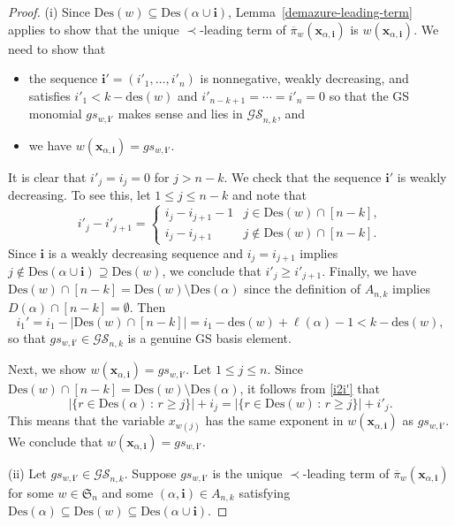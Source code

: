 \documentclass[10pt]{amsart}
\theoremstyle{definition}
\newcommand{\Des}{{\mathrm {Des}}}
\newcommand{\des}{{\mathrm {des}}}
\newcommand{\symm}{{\mathfrak{S}}}
\newcommand{\GS}{{\mathcal{GS}}}
\newcommand{\xx}{{\mathbf {x}}}
\newcommand{\ii}{{\mathbf{i}}}
\newcommand{\pib}{\overline{\pi}}
\begin{document}
\begin{proof}
(i)  Since $\Des(w) \subseteq \Des(\alpha \cup \ii)$,
Lemma~\ref{demazure-leading-term} applies to show that the unique $\prec$-leading term of 
$\pib_w(\xx_{\alpha,\ii})$ is $w(\xx_{\alpha,\ii})$.  
We need to show that
\begin{itemize}
\item
the sequence $\ii' = (i'_1, \dots, i'_n)$ is nonnegative, 
weakly decreasing, and satisfies $i'_1 < k - \des(w)$ and $i'_{n-k+1} = \cdots = i'_n = 0$
so that the GS monomial $gs_{w,\ii'}$ makes sense and lies in $\GS_{n,k}$, and
\item we have $w(\xx_{\alpha,\ii}) = gs_{w,\ii'}$.
\end{itemize}


It is clear that $i'_j = i_j = 0$ for $j > n-k$.
We check that the sequence $\ii'$ is weakly decreasing.  To see this,  let $1 \leq j \leq n-k$ and
note that 
\begin{equation}
i'_j - i'_{j+1} = \begin{cases}
i_j - i_{j+1} - 1 & j \in \Des(w)\cap[n-k], \\
i_j - i_{j+1} & j \notin \Des(w)\cap[n-k].
\end{cases}
\end{equation}
Since $\ii$ is a weakly decreasing sequence and $i_j = i_{j+1}$ implies
$j \notin \Des(\alpha \cup \ii) \supseteq \Des(w)$, we conclude that $i'_j \geq i'_{j+1}$.
Finally, we have $\Des(w)\cap[n-k] = \Des(w)\setminus\Des(\alpha)$ since the definition of $A_{n,k}$ implies $D(\alpha)\cap[n-k]=\emptyset$.
Then
\begin{equation}
i_1' = i_1 - | \Des(w)\cap[n-k] | = i_1 - \des(w) + \ell(\alpha) -1 < k - \des(w),
\end{equation}
so that $gs_{w,\ii'} \in \GS_{n,k}$ is a genuine GS basis element.

Next, we show $w(\xx_{\alpha,\ii}) = gs_{w,\ii'}$.
Let $1 \leq j \leq n$. Since $\Des(w)\cap[n-k] = \Des(w)\setminus\Des(\alpha)$, it follows from \eqref{i2i'} that
\begin{equation}
| \{r \in \Des(\alpha) \,:\, r \geq j \}| + i_j = |\{ r \in \Des(w) \,:\, r \geq j \}| + i'_j.
\end{equation}
This means that the variable $x_{w(j)}$ has the same exponent in $w(\xx_{\alpha,\ii})$
as $gs_{w,\ii'}$.   We conclude that $w(\xx_{\alpha,\ii}) = gs_{w,\ii'}$.

(ii)  Let $gs_{w,\ii'} \in \GS_{n,k}$.  Suppose $gs_{w,\ii'}$ is the unique $\prec$-leading term of 
$\pib_w(\xx_{\alpha,\ii})$ for some $w\in\symm_n$ and some $(\alpha,\ii) \in A_{n,k}$ satisfying
$\Des(\alpha) \subseteq \Des(w) \subseteq \Des(\alpha \cup \ii)$. 


\end{proof}
\end{document}
